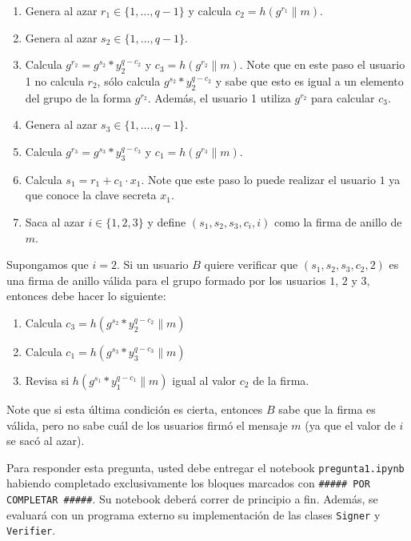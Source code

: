 \begin{enumerate}
\item Genera al azar $r_1 \in \{1, \ldots, q-1\}$ y calcula $c_2 = h(g^{r_1} \| m)$.

\item Genera al azar $s_2 \in \{1, \ldots, q-1\}$.

\item Calcula $g^{r_2} = g^{s_2} * y_2^{q - c_2}$ y $c_3 = h(g^{r_2} \| m)$. Note que en este paso el usuario 1 no calcula $r_2$, sólo calcula $g^{s_2} * y_2^{q - c_2}$ y sabe que esto es igual a un elemento del grupo de la forma $g^{r_2}$. Además, el usuario 1 utiliza $g^{r_2}$ para calcular $c_3$.

\item Genera al azar $s_3 \in \{1, \ldots, q-1\}$.

\item Calcula $g^{r_3} = g^{s_3} * y_3^{q - c_3}$ y $c_1 = h(g^{r_3} \| m)$.

\item Calcula $s_1 = r_1 + c_1 \cdot x_1$. Note que este paso lo puede realizar el usuario $1$ ya que conoce la clave secreta $x_1$.

\item Saca al azar $i\in\{1,2,3\}$ y define $(s_1, s_2, s_3, c_i, i)$ como la firma de anillo de $m$.
\end{enumerate} 
Supongamos que $i=2$. Si un usuario $B$ quiere verificar que $(s_1, s_2, s_3, c_2, 2)$ es una firma de anillo válida para el grupo
formado por los usuarios $1$, $2$ y $3$, entonces debe hacer lo siguiente:

\begin{enumerate}
	\item Calcula $c_3=h(g^{s_2} * y_2^{q - c_2} \| m)$
	\item Calcula $c_1=h(g^{s_3} * y_3^{q - c_3} \| m)$
	\item Revisa si $h(g^{s_1} * y_1^{q - c_1} \| m)$ igual al valor $c_2$ de la firma.
\end{enumerate}
Note que si esta última condición es cierta, entonces $B$ sabe
que la firma es válida, pero no sabe cuál de los usuarios firmó el
mensaje $m$ (ya que el valor de $i$ se sacó al azar).

Para responder esta pregunta, usted debe entregar el notebook \texttt{pregunta1.ipynb} habiendo completado exclusivamente los bloques marcados con \texttt{\#\#\#\#\# POR COMPLETAR \#\#\#\#\#}. Su notebook deberá correr de principio a fin. Además, se evaluará con un programa externo su implementación de las clases \texttt{Signer} y \texttt{Verifier}.

